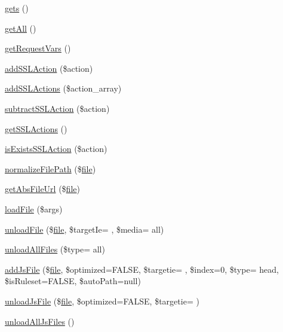\begin{DoxyCompactItemize}
\item 
\hyperlink{classContext_ae906c0b1533a8e4ce7836d3665b46288}{gets} ()
\item 
\hyperlink{classContext_a89ad6fd5c093e257e82822d16dc67ac4}{get\+All} ()
\item 
\hyperlink{classContext_a9ddbc79a7ba5892d1ea2d793f6ad52c2}{get\+Request\+Vars} ()
\item 
\hyperlink{classContext_a781f5e7a057e6f0992310318a0339ae8}{add\+S\+S\+L\+Action} (\$action)
\item 
\hyperlink{classContext_ab2acd5415515b232b7cf9f0130f4efa3}{add\+S\+S\+L\+Actions} (\$action\+\_\+array)
\item 
\hyperlink{classContext_a598cb5c571c0a1ffb15f67064e251f0d}{subtract\+S\+S\+L\+Action} (\$action)
\item 
\hyperlink{classContext_a10b68bdba6f55bc725c352aad7844dc7}{get\+S\+S\+L\+Actions} ()
\item 
\hyperlink{classContext_ada5b689e4d143f371c38091b87cfd864}{is\+Exists\+S\+S\+L\+Action} (\$action)
\item 
\hyperlink{classContext_a47a8a7878385f0d5cb7085f933157128}{normalize\+File\+Path} (\$\hyperlink{classfile}{file})
\item 
\hyperlink{classContext_a217a7ff0e32178c6a2cc761de9c88998}{get\+Abs\+File\+Url} (\$\hyperlink{classfile}{file})
\item 
\hyperlink{classContext_a01ddbd076a74f16dc46d3c7b358daea6}{load\+File} (\$args)
\item 
\hyperlink{classContext_afab39232525ca876120253feee0fe3a1}{unload\+File} (\$\hyperlink{classfile}{file}, \$target\+Ie= \textquotesingle{}\textquotesingle{}, \$media= \textquotesingle{}all\textquotesingle{})
\item 
\hyperlink{classContext_a9125192700ddd7a2234f34a192165902}{unload\+All\+Files} (\$type= \textquotesingle{}all\textquotesingle{})
\item 
\hyperlink{classContext_a69807c3ced3f97920b233a3fce3bb492}{add\+Js\+File} (\$\hyperlink{classfile}{file}, \$optimized=F\+A\+L\+S\+E, \$targetie= \textquotesingle{}\textquotesingle{}, \$index=0, \$type= \textquotesingle{}head\textquotesingle{}, \$is\+Ruleset=F\+A\+L\+S\+E, \$auto\+Path=null)
\item 
\hyperlink{classContext_ac5016f24f0bd279096d3f0cd0c0df5a9}{unload\+Js\+File} (\$\hyperlink{classfile}{file}, \$optimized=F\+A\+L\+S\+E, \$targetie= \textquotesingle{}\textquotesingle{})
\item 
\hyperlink{classContext_ac8ac4c21583b50815eb01d9cc4f6405f}{unload\+All\+Js\+Files} ()

\end{DoxyCompactItemize}
